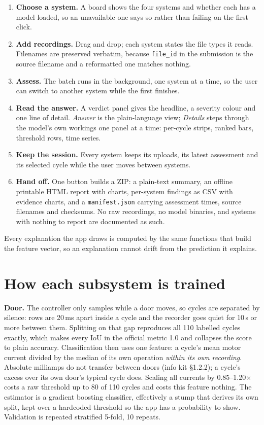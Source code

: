\documentclass[11pt,a4paper]{article}
\begin{document}
\begin{enumerate}
  \item \textbf{Choose a system.} A board shows the four systems and whether each has a model
        loaded, so an unavailable one says so rather than failing on the first click.
  \item \textbf{Add recordings.} Drag and drop; each system states the file types it reads.
        Filenames are preserved verbatim, because \texttt{file\_id} in the submission is the
        source filename and a reformatted one matches nothing.
  \item \textbf{Assess.} The batch runs in the background, one system at a time, so the user can
        switch to another system while the first finishes.
  \item \textbf{Read the answer.} A verdict panel gives the headline, a severity colour and one
        line of detail. \emph{Answer} is the plain-language view; \emph{Details} steps through the
        model's own workings one panel at a time: per-cycle strips, ranked bars, threshold rows,
        time series.
  \item \textbf{Keep the session.} Every system keeps its uploads, its latest assessment and its
        selected cycle while the user moves between systems.
  \item \textbf{Hand off.} One button builds a ZIP: a plain-text summary, an offline printable
        HTML report with charts, per-system findings as CSV with evidence charts, and a
        \texttt{manifest.json} carrying assessment times, source filenames and checksums. No raw
        recordings, no model binaries, and systems with nothing to report are documented as such.
\end{enumerate}

Every explanation the app draws is computed by the same functions that build the feature vector,
so an explanation cannot drift from the prediction it explains.

\section{How each subsystem is trained}

\textbf{Door.} The controller only samples while a door moves, so cycles are separated by silence:
rows are 20\,ms apart inside a cycle and the recorder goes quiet for 10\,s or more between them.
Splitting on that gap reproduces all 110 labelled cycles exactly, which makes every IoU in the
official metric 1.0 and collapses the score to plain accuracy. Classification then uses one
feature: a cycle's mean motor current divided by the median of its own operation \emph{within its
own recording}. Absolute milliamps do not transfer between doors (info kit \S1.2.2); a cycle's
excess over its own door's typical cycle does. Scaling all currents by 0.85--1.20$\times$ costs a
raw threshold up to 80 of 110 cycles and costs this feature nothing. The estimator is a gradient
boosting classifier, effectively a stump that derives its own split, kept over a hardcoded
threshold so the app has a probability to show. Validation is repeated stratified 5-fold,
10 repeats.
\end{document}
